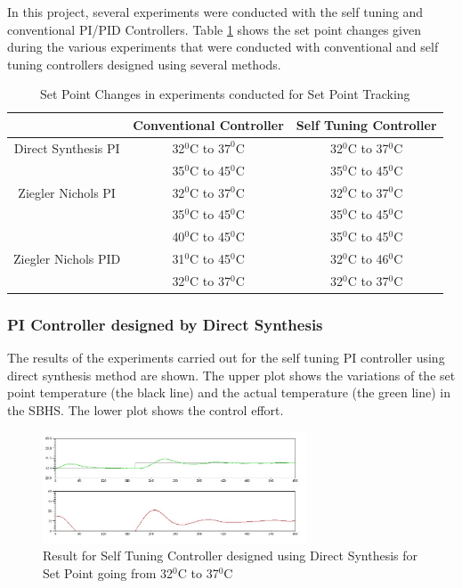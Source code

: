 In this project, several experiments were conducted with the self tuning and conventional PI/PID Controllers. Table \ref{spt} shows the set point changes given during the various experiments that were conducted with conventional and self tuning controllers designed using several methods.
\begin{table}[h]
	\centering
		\begin{tabular}{||c|c|c|}\hline
			&Conventional Controller&Self Tuning Controller\\\hline \hline
		Direct Synthesis PI&32$^0$C to $37^0$C&32$^0$C to 37$^0$C\\
											 &35$^0$C to 45$^0$C&35$^0$C to 45$^0$C\\\hline
		Ziegler Nichols PI&32$^0$C to 37$^0$C&32$^0$C to 37$^0$C\\
												&35$^0$C to 45$^0$C&35$^0$C to 45$^0$C\\
												&40$^0$C to 45$^0$C&35$^0$C to 45$^0$C\\\hline
		Ziegler Nichols PID&31$^0$C to 45$^0$C&32$^0$C to 46$^0$C\\
												&32$^0$C to 37$^0$C&32$^0$C to 37$^0$C\\\hline
		\end{tabular}
	\caption{Set Point Changes in experiments conducted for Set Point Tracking}
	\label{spt}
\end{table}
\newpage
\subsubsection{PI Controller designed by Direct Synthesis}
The results of the experiments carried out for the self tuning PI controller using direct synthesis method are shown. The upper plot shows the variations of the set point temperature (the black line) and the actual temperature (the green line) in the SBHS. The lower plot shows the control effort.
\begin{figure}[h]
	\centering
\includegraphics[width=0.7\textwidth]{Vikas_self/report_tex/PID_results/self_tuning/NewSetpoint_change/DirectSynthesis/step32to37.jpg}
	\caption{Result for Self Tuning Controller designed using Direct Synthesis for Set Point going from 32$^0$C to 37$^0$C}
	\label{fig:step32to37}
\end{figure}


